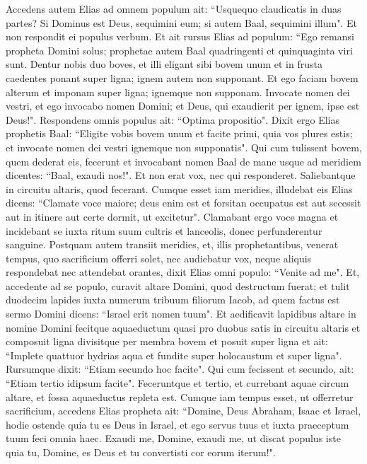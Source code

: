 \begin{biblechapter}
\verse Accedens autem Elias ad omnem populum ait: “Usquequo claudicatis in duas partes? Si Dominus est Deus, sequimini eum; si autem Baal, sequimini illum". Et non respondit ei populus verbum. 
\verse Et ait rursus Elias ad populum: “Ego remansi propheta Domini solus; prophetae autem Baal quadringenti et quinquaginta viri sunt. 
\verse Dentur nobis duo boves, et illi eligant sibi bovem unum et in frusta caedentes ponant super ligna; ignem autem non supponant. Et ego faciam bovem alterum et imponam super ligna; ignemque non supponam. 
\verse Invocate nomen dei vestri, et ego invocabo nomen Domini; et Deus, qui exaudierit per ignem, ipse est Deus!". Respondens omnis populus ait: “Optima propositio". 
\verse Dixit ergo Elias prophetis Baal: “Eligite vobis bovem unum et facite primi, quia vos plures estis; et invocate nomen dei vestri ignemque non supponatis".  
\verse Qui cum tulissent bovem, quem dederat eis, fecerunt et invocabant nomen Baal de mane usque ad meridiem dicentes: “Baal, exaudi nos!". Et non erat vox, nec qui responderet. Saliebantque in circuitu altaris, quod fecerant. 
\verse Cumque esset iam meridies, illudebat eis Elias dicens: “Clamate voce maiore; deus enim est et forsitan occupatus est aut secessit aut in itinere aut certe dormit, ut excitetur". 
\verse Clamabant ergo voce magna et incidebant se iuxta ritum suum cultris et lanceolis, donec perfunderentur sanguine. 
\verse Postquam autem transiit meridies, et, illis prophetantibus, venerat tempus, quo sacrificium offerri solet, nec audiebatur vox, neque aliquis respondebat nec attendebat orantes, 
\verse dixit Elias omni populo: “Venite ad me". Et, accedente ad se populo, curavit altare Domini, quod destructum fuerat; 
\verse et tulit duodecim lapides iuxta numerum tribuum filiorum Iacob, ad quem factus est sermo Domini dicens: “Israel erit nomen tuum". 
\verse Et aedificavit lapidibus altare in nomine Domini fecitque aquaeductum quasi pro duobus satis in circuitu altaris 
\verse et composuit ligna divisitque per membra bovem et posuit super ligna 
\verse et ait: “Implete quattuor hydrias aqua et fundite super holocaustum et super ligna". Rursumque dixit: “Etiam secundo hoc facite". Qui cum fecissent et secundo, ait: “Etiam tertio idipsum facite". Feceruntque et tertio, 
\verse et currebant aquae circum altare, et fossa aquaeductus repleta est. 
\verse Cumque iam tempus esset, ut offerretur sacrificium, accedens Elias propheta ait: “Domine, Deus Abraham, Isaac et Israel, hodie ostende quia tu es Deus in Israel, et ego servus tuus et iuxta praeceptum tuum feci omnia haec. 
\verse Exaudi me, Domine, exaudi me, ut discat populus iste quia tu, Domine, es Deus et tu convertisti cor eorum iterum!". 

\end{biblechapter}
